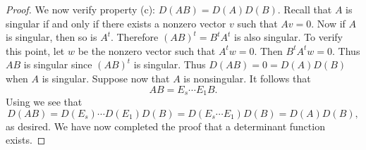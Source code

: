 \documentclass{ximera}
\begin{document}
\begin{proof}
We now verify property (c): $D(AB)=D(A)D(B)$.  Recall that $A$
is singular if and only if there exists a nonzero vector $v$
such that $Av=0$.  Now if $A$ is singular, then so is $A^t$.
Therefore $(AB)^t=B^tA^t$ is also singular.  To verify this
point, let $w$ be the nonzero vector such that $A^tw=0$.  Then
$B^tA^tw=0$.  Thus $AB$ is singular since $(AB)^t$ is singular.
Thus $D(AB)=0=D(A)D(B)$ when $A$ is singular.  Suppose now that
$A$ is nonsingular.  It follows that 
\[
AB = E_s\cdots E_1B.
\]
Using  we see that
\[
D(AB)=D(E_s)\cdots D(E_1)D(B) = D(E_s\cdots E_1)D(B) = D(A)D(B),
\]
as desired. We have now completed the proof that a determinant
function exists. \end{proof}
\end{document}
